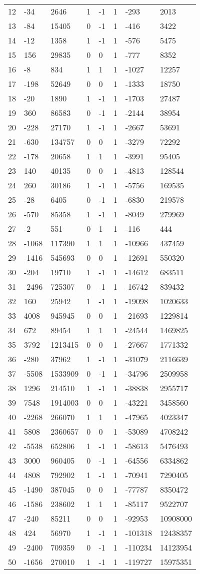 \documentclass{amsart}
\begin{document}
\begin{longtable}{|l|l|l|lllll|}
12&-34&2646&1&-1&1&-293&2013\\
13&-84&15405&0&-1&1&-416&3422\\
14&-12&1358&1&-1&1&-576&5475\\
15&156&29835&0&0&1&-777&8352\\
16&-8&834&1&1&1&-1027&12257\\
17&-198&52649&0&0&1&-1333&18750\\
18&-20&1890&1&-1&1&-1703&27487\\
19&360&86583&0&-1&1&-2144&38954\\
20&-228&27170&1&-1&1&-2667&53691\\
21&-630&134757&0&0&1&-3279&72292\\
22&-178&20658&1&1&1&-3991&95405\\
23&140&40135&0&0&1&-4813&128544\\
24&260&30186&1&-1&1&-5756&169535\\
25&-28&6405&0&-1&1&-6830&219578\\
26&-570&85358&1&-1&1&-8049&279969\\
27&-2&551&0&1&1&-116&444\\
28&-1068&117390&1&1&1&-10966&437459\\
29&-1416&545693&0&0&1&-12691&550320\\
30&-204&19710&1&-1&1&-14612&683511\\
31&-2496&725307&0&-1&1&-16742&839432\\
32&160&25942&1&-1&1&-19098&1020633\\
33&4008&945945&0&0&1&-21693&1229814\\
34&672&89454&1&1&1&-24544&1469825\\
35&3792&1213415&0&0&1&-27667&1771332\\
36&-280&37962&1&-1&1&-31079&2116639\\
37&-5508&1533909&0&-1&1&-34796&2509958\\
38&1296&214510&1&-1&1&-38838&2955717\\
39&7548&1914003&0&0&1&-43221&3458560\\
40&-2268&266070&1&1&1&-47965&4023347\\
41&5808&2360657&0&0&1&-53089&4708242\\
42&-5538&652806&1&-1&1&-58613&5476493\\
43&3000&960405&0&-1&1&-64556&6334862\\
44&4808&792902&1&-1&1&-70941&7290405\\
45&-1490&387045&0&0&1&-77787&8350472\\
46&-1586&238602&1&1&1&-85117&9522707\\
47&-240&85211&0&0&1&-92953&10908000\\
48&424&56970&1&-1&1&-101318&12438357\\
49&-2400&709359&0&-1&1&-110234&14123954\\
50&-1656&270010&1&-1&1&-119727&15975351\\
\hline
\end{longtable}
\end{document}
